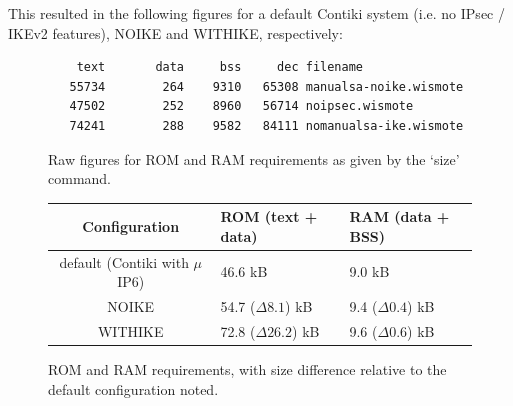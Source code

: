 \documentclass[final,a4paper,twoside,11pt,onecolumn]{report}
\begin{document}
This resulted in the following figures for a default Contiki system (i.e. no IPsec / IKEv2 features), NOIKE and WITHIKE, respectively:

\begin{figure}[h]
\begin{verbatim}
    text	   data	    bss	    dec	filename
   55734	    264	   9310	  65308	manualsa-noike.wismote
   47502	    252	   8960	  56714	noipsec.wismote
   74241	    288	   9582	  84111	nomanualsa-ike.wismote
\end{verbatim}
\caption{Raw figures for ROM and RAM requirements as given by the `size' command.}
\end{figure}



\begin{figure}[h]
\begin{tabular}{c|l|l}
Configuration                          & ROM (text + data)        & RAM (data + BSS)            \\ \hline
default (Contiki with $\mu$IP6)        & 46.6 kB                  & 9.0 kB                      \\
NOIKE                                  & 54.7 ($\Delta8.1$) kB    & 9.4 ($\Delta0.4$) kB        \\
WITHIKE                                & 72.8 ($\Delta26.2$) kB   & 9.6 ($\Delta0.6$) kB
\end{tabular}
\label{tab:rom-ram-eval}
\caption{ROM and RAM requirements, with size difference relative to the default configuration noted.}
\end{figure}

% 


% 
% 
% 
% 
\end{document}
